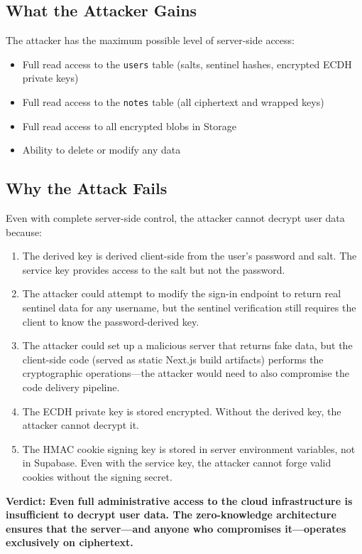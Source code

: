 \subsection{What the Attacker Gains}

The attacker has the maximum possible level of server-side access:
\begin{itemize}
    \item Full read access to the \texttt{users} table (salts, sentinel hashes, encrypted ECDH private keys)
    \item Full read access to the \texttt{notes} table (all ciphertext and wrapped keys)
    \item Full read access to all encrypted blobs in Storage
    \item Ability to delete or modify any data
\end{itemize}

\subsection{Why the Attack Fails}

Even with complete server-side control, the attacker cannot decrypt user data because:

\begin{enumerate}
    \item The derived key is derived client-side from the user's password and salt. The service key provides access to the salt but not the password.
    \item The attacker could attempt to modify the sign-in endpoint to return real sentinel data for any username, but the sentinel verification still requires the client to know the password-derived key.
    \item The attacker could set up a malicious server that returns fake data, but the client-side code (served as static Next.js build artifacts) performs the cryptographic operations---the attacker would need to also compromise the code delivery pipeline.
    \item The ECDH private key is stored encrypted. Without the derived key, the attacker cannot decrypt it.
    \item The HMAC cookie signing key is stored in server environment variables, not in Supabase. Even with the service key, the attacker cannot forge valid cookies without the signing secret.
\end{enumerate}

\textbf{Verdict: Even full administrative access to the cloud infrastructure is insufficient to decrypt user data. The zero-knowledge architecture ensures that the server---and anyone who compromises it---operates exclusively on ciphertext.}

